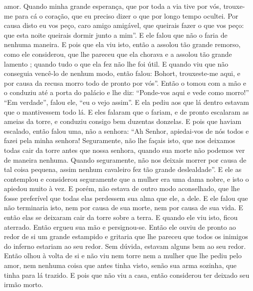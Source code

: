 amor. Quando minha grande esperança, que por toda a via tive por vós, trouxe-me
para cá o coração, que eu preciso dizer o que por longo tempo ocultei. Por
causa disto eu vos peço, caro amigo amigável, que queirais fazer o que vos
peço: que esta noite queirais dormir junto a mim”. E ele falou que não o faria
de nenhuma maneira. E pois que ela viu isto, então a assolou tão grande
remorso, como ele considerou, que lhe pareceu que ela chorava e a assolou tão
grande lamento ; quando tudo o que ela fez não lhe foi útil. E quando viu que
não conseguia vencê-lo de nenhum modo, então falou: Bohort, trouxeste-me aqui,
e por causa da recusa morro todo de pronto por vós”. Então o tomou com a mão e
o conduziu até a porta do palácio e lhe diz: “Ponde-vos aqui e vede como
morro!” “Em verdade”, falou ele, “eu o vejo assim”. E ela pediu aos que lá
dentro estavam que o mantivessem todo lá. E eles falaram que o fariam, e de
pronto escalaram as ameias da torre, e conduziu consigo bem duzentas donzelas.
E pois que haviam escalado, então falou uma, não a senhora: “Ah Senhor,
apiedai-vos de nós todos e fazei pela minha senhora! Seguramente, não lhe
façais isto, que nos deixamos todas cair da torre antes que nossa senhora,
quando sua morte não podemos ver de maneira nenhuma. Quando
seguramente, não nos deixais morrer por causa de tal coisa pequena, assim
nenhum cavaleiro fez tão grande deslealdade”. E ele as contemplou e considerou
seguramente que a mulher era uma dama nobre, e isto o apiedou muito à vez. E
porém, não estava de outro modo aconselhado, que lhe fosse preferível que todas
elas perdessem sua alma que ele, a dele. E ele falou que não terminaria isto,
nem por causa de sua morte, nem por causa de sua vida. E então
elas se deixaram cair da torre sobre a terra. E quando ele viu isto, ficou
aterrado. Então ergueu sua mão e persignou-se. Então ele ouviu de pronto ao
redor de si um grande estampido e gritaria que lhe pareceu que todos os
inimigos do inferno estariam ao seu redor. Sem dúvida, estavam alguns bem ao
seu redor. Então olhou à volta de si e não viu nem torre nem a mulher que lhe
pediu pelo amor, nem nenhuma coisa que antes tinha visto, senão sua arma
sozinha, que tinha para lá trazido. E pois que não viu a casa, então considerou
ter deixado seu irmão morto. 

